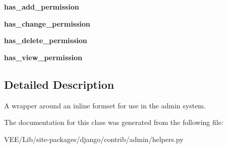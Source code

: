 \begin{DoxyCompactItemize}
{\bfseries has\+\_\+add\+\_\+permission}
\item 
\mbox{\label{classdjango_1_1contrib_1_1admin_1_1helpers_1_1_inline_admin_form_set_a17039b9705edefe91a2588ff7902ce44}} 
{\bfseries has\+\_\+change\+\_\+permission}
\item 
\mbox{\label{classdjango_1_1contrib_1_1admin_1_1helpers_1_1_inline_admin_form_set_a8db9642f60be98f4435e4f8c9c326dc1}} 
{\bfseries has\+\_\+delete\+\_\+permission}
\item 
\mbox{\label{classdjango_1_1contrib_1_1admin_1_1helpers_1_1_inline_admin_form_set_a5a648c8b1477f6e0718eac370cb5aefd}} 
{\bfseries has\+\_\+view\+\_\+permission}
\end{DoxyCompactItemize}


\subsection{Detailed Description}
\begin{DoxyVerb}A wrapper around an inline formset for use in the admin system.
\end{DoxyVerb}
 

The documentation for this class was generated from the following file\+:\begin{DoxyCompactItemize}
\item 
V\+E\+E/\+Lib/site-\/packages/django/contrib/admin/helpers.\+py\end{DoxyCompactItemize}
